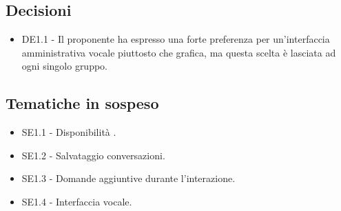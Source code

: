 \documentclass[a4paper,titlepage]{article}
\begin{document}
 \subsection{Decisioni}
 \begin{itemize}
  \item DE1.1 - Il proponente ha espresso una forte preferenza per un'interfaccia amministrativa vocale piuttosto che grafica, ma questa scelta è lasciata ad ogni singolo gruppo. 

 \end{itemize}

\subsection{Tematiche in sospeso}
  \begin{itemize}
  \item SE1.1 - Disponibilità .
  \item SE1.2 - Salvataggio conversazioni.
  \item SE1.3 - Domande aggiuntive durante l'interazione.
  \item SE1.4 - Interfaccia vocale.
  \end{itemize}
\end{document}
